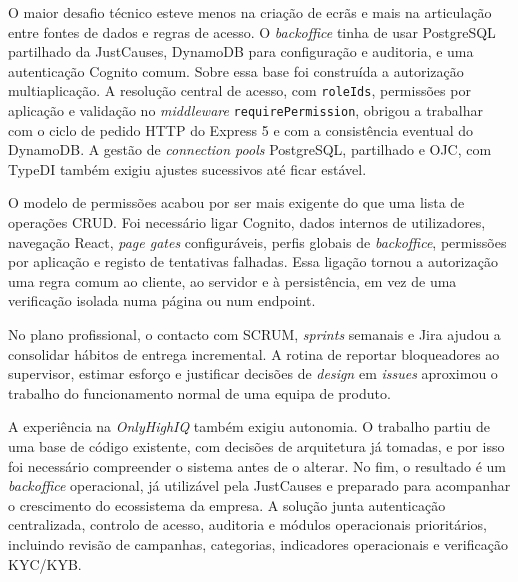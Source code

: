 O maior desafio técnico esteve menos na criação de ecrãs e mais na articulação entre fontes de dados e regras de acesso. O \textit{backoffice} tinha de usar PostgreSQL partilhado da JustCauses, DynamoDB para configuração e auditoria, e uma autenticação Cognito comum. Sobre essa base foi construída a autorização multiaplicação. A resolução central de acesso, com \texttt{roleIds}, permissões por aplicação e validação no \textit{middleware} \texttt{requirePermission}, obrigou a trabalhar com o ciclo de pedido HTTP do Express 5 e com a consistência eventual do DynamoDB. A gestão de \textit{connection pools} PostgreSQL, partilhado e OJC, com TypeDI também exigiu ajustes sucessivos até ficar estável.

O modelo de permissões acabou por ser mais exigente do que uma lista de operações \gls{CRUD}. Foi necessário ligar Cognito, dados internos de utilizadores, navegação React, \textit{page gates} configuráveis, perfis globais de \textit{backoffice}, permissões por aplicação e registo de tentativas falhadas. Essa ligação tornou a autorização uma regra comum ao cliente, ao servidor e à persistência, em vez de uma verificação isolada numa página ou num endpoint.

No plano profissional, o contacto com SCRUM, \textit{sprints} semanais e Jira ajudou a consolidar hábitos de entrega incremental. A rotina de reportar bloqueadores ao supervisor, estimar esforço e justificar decisões de \textit{design} em \textit{issues} aproximou o trabalho do funcionamento normal de uma equipa de produto.

A experiência na \textit{OnlyHighIQ} também exigiu autonomia. O trabalho partiu de uma base de código existente, com decisões de arquitetura já tomadas, e por isso foi necessário compreender o sistema antes de o alterar. No fim, o resultado é um \textit{backoffice} operacional, já utilizável pela JustCauses e preparado para acompanhar o crescimento do ecossistema da empresa. A solução junta autenticação centralizada, controlo de acesso, auditoria e módulos operacionais prioritários, incluindo revisão de campanhas, categorias, indicadores operacionais e verificação \gls{KYC}/\gls{KYB}.
